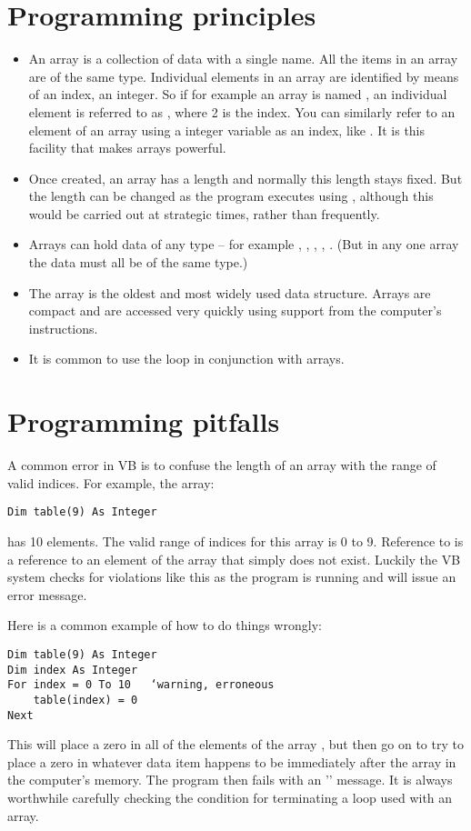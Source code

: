 	\section{Programming principles}
		\begin{itemize}	
			\item An array is a collection of data with a single name. All the items in an array are of the same type. Individual elements in an array are identified by means of an index, an integer. So if for example an array is named , an individual element is referred to as , where 2 is the index. You can similarly refer to an element of an array using a integer variable as an index, like . It is this facility that makes arrays powerful.
      \item Once created, an array has a length and normally this length stays fixed. But the length can be changed as the program executes using , although this would be carried out at strategic times, rather than frequently.
      \item Arrays can hold data of any type – for example , , , , . (But in any one array the data must all be of the same type.) 
      \item The array is the oldest and most widely used data structure. Arrays are compact and are accessed very quickly using support from the computer's instructions.
      \item It is common to use the  loop in conjunction with arrays.
		\end{itemize}


	\section{Programming pitfalls}
		A common error in VB is to confuse the length of an array with the range of valid indices. For example, the array:
		\begin{lstlisting}
Dim table(9) As Integer
		\end{lstlisting}
		has 10 elements. The valid range of indices for this array is 0 to 9. Reference to  is a reference to an element of the array that simply does not exist. Luckily the VB system checks for violations like this as the program is running and will issue an error message.
		
		Here is a common example of how to do things wrongly:
		\begin{lstlisting}
Dim table(9) As Integer
Dim index As Integer
For index = 0 To 10   ‘warning, erroneous
	table(index) = 0
Next
		\end{lstlisting}
		This will place a zero in all of the elements of the array , but then go on to try to place a zero in whatever data item happens to be immediately after the array in the computer's memory. The program then fails with an '' message. It is always worthwhile carefully checking the condition for terminating a  loop used with an array.
		
